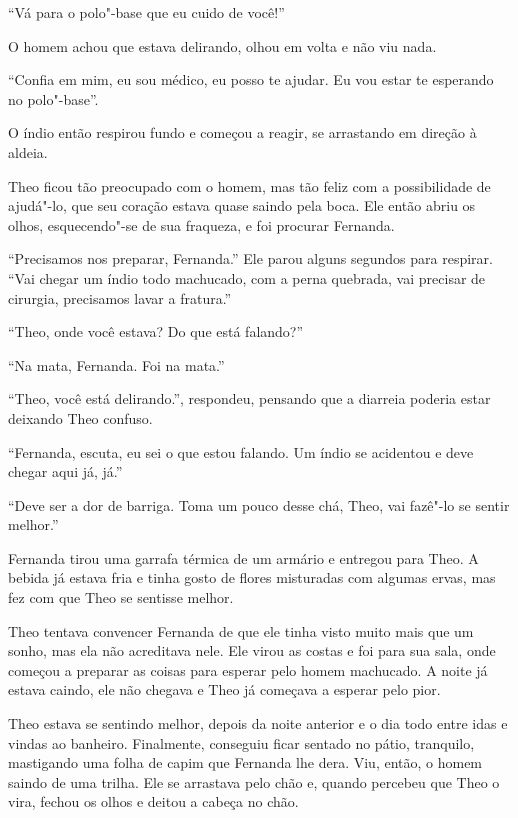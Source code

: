 ``Vá para o polo"-base que eu cuido de você!''

O homem achou que estava delirando, olhou em volta e não viu nada.

``Confia em mim, eu sou médico, eu posso te ajudar. Eu vou estar te
esperando no polo"-base''.

O índio então respirou fundo e começou a reagir, se arrastando em
direção à aldeia.

Theo ficou tão preocupado com o homem, mas tão feliz com a possibilidade
de ajudá"-lo, que seu coração estava quase saindo pela boca. Ele então
abriu os olhos, esquecendo"-se de sua fraqueza, e foi procurar Fernanda.

``Precisamos nos preparar, Fernanda.'' Ele parou alguns segundos para
respirar. ``Vai chegar um índio todo machucado, com a perna quebrada,
vai precisar de cirurgia, precisamos lavar a fratura.''

``Theo, onde você estava? Do que está falando?''

``Na mata, Fernanda. Foi na mata.''

``Theo, você está delirando.'', respondeu, pensando que a diarreia
poderia estar deixando Theo confuso.

``Fernanda, escuta, eu sei o que estou falando. Um índio se acidentou e
deve chegar aqui já, já.''

``Deve ser a dor de barriga. Toma um pouco desse chá, Theo, vai fazê"-lo
se sentir melhor.''

Fernanda tirou uma garrafa térmica de um armário e entregou para Theo. A
bebida já estava fria e tinha gosto de flores misturadas com algumas
ervas, mas fez com que Theo se sentisse melhor.

Theo tentava convencer Fernanda de que ele tinha visto muito mais que um
sonho, mas ela não acreditava nele. Ele virou as costas e foi para sua
sala, onde começou a preparar as coisas para esperar pelo homem
machucado. A noite já estava caindo, ele não chegava e Theo já começava
a esperar pelo pior.

\asterisc


Theo estava se sentindo melhor, depois da noite anterior e o dia todo
entre idas e vindas ao banheiro. Finalmente, conseguiu ficar sentado no
pátio, tranquilo, mastigando uma folha de capim que Fernanda lhe dera.
Viu, então, o homem saindo de uma trilha. Ele se arrastava pelo chão e,
quando percebeu que Theo o vira, fechou os olhos e deitou a cabeça no
chão.

